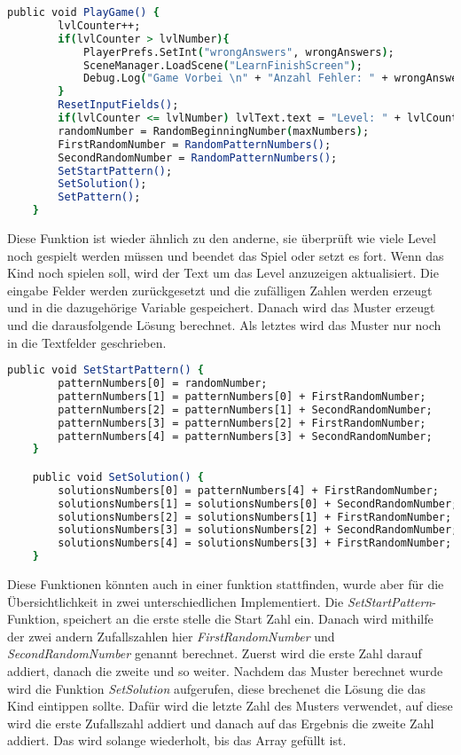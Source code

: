\begin{lstlisting}[language=csh, caption={hideCircle.cs PlayGame-Funktion}]
	public void PlayGame() {
		lvlCounter++;
		if(lvlCounter > lvlNumber){
			PlayerPrefs.SetInt("wrongAnswers", wrongAnswers);
			SceneManager.LoadScene("LearnFinishScreen");
			Debug.Log("Game Vorbei \n" + "Anzahl Fehler: " + wrongAnswers);
		}
		ResetInputFields();
		if(lvlCounter <= lvlNumber)	lvlText.text = "Level: " + lvlCounter + "/" + lvlNumber;;
		randomNumber = RandomBeginningNumber(maxNumbers);
		FirstRandomNumber = RandomPatternNumbers();
		SecondRandomNumber = RandomPatternNumbers();
		SetStartPattern();
		SetSolution();
		SetPattern();
	}
\end{lstlisting}
Diese Funktion ist wieder ähnlich zu den anderne, sie überprüft wie viele Level noch gespielt werden müssen und beendet das Spiel oder setzt es fort. Wenn das Kind noch spielen soll, wird der Text um das Level anzuzeigen aktualisiert. Die eingabe Felder werden zurückgesetzt und die zufälligen Zahlen werden erzeugt und in die dazugehörige Variable gespeichert. Danach wird das Muster erzeugt und die darausfolgende Lösung berechnet. Als letztes wird das Muster nur noch in die Textfelder geschrieben.\\
\begin{lstlisting}[language=csh, caption={hideCircle.cs SetStartPattern- und SetSolution-Funktion}]
	public void SetStartPattern() {
		patternNumbers[0] = randomNumber;
		patternNumbers[1] = patternNumbers[0] + FirstRandomNumber;
		patternNumbers[2] = patternNumbers[1] + SecondRandomNumber;
		patternNumbers[3] = patternNumbers[2] + FirstRandomNumber;
		patternNumbers[4] = patternNumbers[3] + SecondRandomNumber;
	}

	public void SetSolution() {
		solutionsNumbers[0] = patternNumbers[4] + FirstRandomNumber;
		solutionsNumbers[1] = solutionsNumbers[0] + SecondRandomNumber;
		solutionsNumbers[2] = solutionsNumbers[1] + FirstRandomNumber;
		solutionsNumbers[3] = solutionsNumbers[2] + SecondRandomNumber;
		solutionsNumbers[4] = solutionsNumbers[3] + FirstRandomNumber;
	}
\end{lstlisting}
Diese Funktionen könnten auch in einer funktion stattfinden, wurde aber für die Übersichtlichkeit in zwei unterschiedlichen Implementiert. Die \textit{SetStartPattern}-Funktion, speichert an die erste stelle die Start Zahl ein. Danach wird mithilfe der zwei andern Zufallszahlen hier \textit{FirstRandomNumber} und \textit{SecondRandomNumber} genannt berechnet. Zuerst wird die erste Zahl darauf addiert, danach die zweite und so weiter. Nachdem das Muster berechnet wurde wird die Funktion \textit{SetSolution} aufgerufen, diese brechenet die Lösung die das Kind eintippen sollte. Dafür wird die letzte Zahl des Musters verwendet, auf diese wird die erste Zufallszahl addiert und danach auf das Ergebnis die zweite Zahl addiert. Das wird solange wiederholt, bis das Array gefüllt ist.\\
